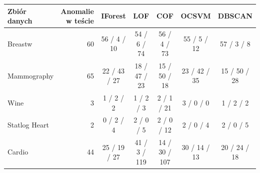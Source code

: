 \begin{tabular}{lrccccc}
\toprule
Zbiór danych & \makecell[r]{Anomalie\\w teście} & IForest & LOF & COF & OCSVM & DBSCAN \\
\midrule
Breastw & 60 & 56 / 4 / 10 & 54 / 6 / 74 & 56 / 4 / 73 & 55 / 5 / 12 & 57 / 3 / 8 \\
Mammography & 65 & 22 / 43 / 27 & 18 / 47 / 23 & 15 / 50 / 18 & 23 / 42 / 35 & 15 / 50 / 28 \\
Wine & 3 & 1 / 2 / 2 & 1 / 2 / 3 & 2 / 1 / 21 & 3 / 0 / 0 & 1 / 2 / 2 \\
Statlog Heart & 2 & 0 / 2 / 4 & 2 / 0 / 5 & 2 / 0 / 12 & 2 / 0 / 4 & 2 / 0 / 5 \\
Cardio & 44 & 25 / 19 / 27 & 41 / 3 / 119 & 14 / 30 / 107 & 30 / 14 / 13 & 20 / 24 / 18 \\
\bottomrule
\end{tabular}
